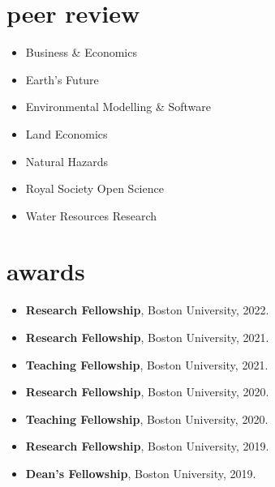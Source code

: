 \documentclass[10pt,oneside]{article}
\begin{document}

\section{peer review}

\mbox{}\vspace{-\dimexpr\baselineskip\relax}

\begin{itemize}[label={}]
  
    \item Business \& Economics
  
    \item Earth's Future
  
    \item Environmental Modelling \& Software
  
    \item Land Economics
  
    \item Natural Hazards
  
    \item Royal Society Open Science
  
    \item Water Resources Research
  
\end{itemize}


\section{awards}

\mbox{}\vspace{-\dimexpr\baselineskip\relax}

\begin{itemize}[label={}]
  
  \item \textbf{Research Fellowship}, Boston University, 2022.
        
  \item \textbf{Research Fellowship}, Boston University, 2021.
        
  \item \textbf{Teaching Fellowship}, Boston University, 2021.
        
  \item \textbf{Research Fellowship}, Boston University, 2020.
        
  \item \textbf{Teaching Fellowship}, Boston University, 2020.
        
  \item \textbf{Research Fellowship}, Boston University, 2019.
        
  \item \textbf{Dean's Fellowship}, Boston University, 2019.
        
\end{itemize}
\end{document}
